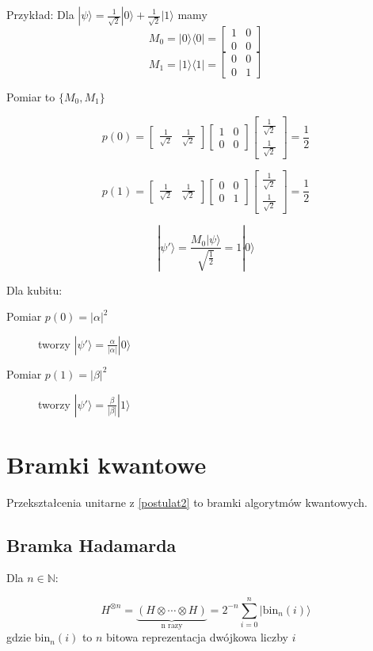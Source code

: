 \documentclass{article}
\newcommand\NN{\mathbb{N}}
\begin{document}
		Przykład: Dla $|\psi\rangle = \frac{1}{\sqrt{2}} |0\rangle + \frac{1}{\sqrt{2}}|1\rangle$ mamy
		$$ M_0 = |0\rangle \langle0| = \begin{bmatrix} 1 & 0 \\ 0 & 0 \end{bmatrix} $$
		$$ M_1 = |1\rangle \langle1| = \begin{bmatrix} 0 & 0 \\ 0 & 1 \end{bmatrix} $$

		Pomiar to	$ \{ M_0, M_1 \} $

		$$ p(0) = \begin{bmatrix}  \frac{1}{\sqrt{2}} &  \frac{1}{\sqrt{2}} \end{bmatrix} \begin{bmatrix} 1 & 0 \\ 0 & 0 \end{bmatrix} \begin{bmatrix} \frac{1}{\sqrt{2}} \\ \frac{1}{\sqrt{2}}  \end{bmatrix} = \frac{1}{2}$$

			$$ p(1) = \begin{bmatrix}  \frac{1}{\sqrt{2}} &  \frac{1}{\sqrt{2}} \end{bmatrix} \begin{bmatrix} 0 & 0 \\ 0 & 1 \end{bmatrix} \begin{bmatrix} \frac{1}{\sqrt{2}} \\ \frac{1}{\sqrt{2}}  \end{bmatrix} = \frac{1}{2} $$

			$$ |\psi'\rangle = \frac{M_0|\psi\rangle}{\sqrt{\frac{1}{2}}} = 1|0\rangle $$

		Dla kubitu: \begin{description}
			\item[Pomiar $ p(0) = |\alpha|^2 $] tworzy $ |\psi'\rangle = \frac{\alpha}{|\alpha|}|0\rangle $
			\item[Pomiar $ p(1) = |\beta|^2 $] tworzy $ |\psi'\rangle = \frac{\beta}{|\beta|}|1\rangle $
		\end{description}

\section{Bramki kwantowe}

Przekształcenia unitarne z \ref{postulat2} to bramki algorytmów kwantowych.

\subsection{Bramka Hadamarda}

Dla $ n \in \NN $:

$$
	H^{\otimes n} = \underbrace{\left( H \otimes \cdots \otimes H \right)}_{\text{n razy}} = 2^{-n} \sum_{i=0}^{n} |\text{bin}_n(i)\rangle
$$ gdzie $\text{bin}_n(i)$ to $n$ bitowa reprezentacja dwójkowa liczby $i$
\end{document}
